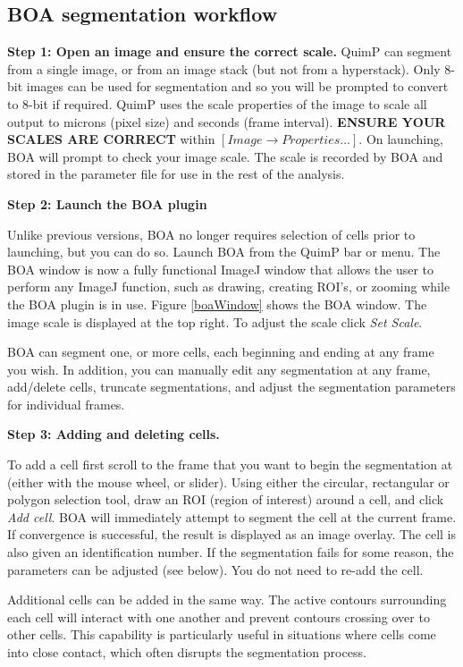 \documentclass[a4paper,12pt]{article}
\begin{document}
\subsection{BOA segmentation workflow}
\textbf{Step 1: Open an image and ensure the correct scale.}  QuimP can segment from a single image, or from an image stack
(but not from a hyperstack).  Only 8-bit images can be used for segmentation and so you will be prompted to convert to 8-bit 
if required.  QuimP uses the scale properties of the image to scale all output to
 microns (pixel size) and seconds (frame interval).  \textbf{ENSURE YOUR SCALES ARE CORRECT} within $[Image\rightarrow Properties...]$.
 On launching, BOA will prompt to check your image scale. The scale is recorded by BOA and stored in the parameter file for
 use in the rest of the analysis. 


\textbf{Step 2: Launch the BOA plugin} 

Unlike previous versions, BOA no longer requires selection of cells prior to launching, but you can do so.  Launch BOA from the QuimP bar or menu.
The BOA window is now a fully functional ImageJ window that allows the user to perform any ImageJ function, such as drawing,
creating ROI's, or zooming while the BOA plugin is in use.  Figure \ref{boaWindow} shows the BOA window.
The image scale is displayed at the top right.  To adjust the scale click \textit{Set Scale}.      

BOA can segment one, or more cells, each beginning and ending at any frame you wish.  In addition, you can manually 
edit any segmentation at any frame, add/delete cells, truncate segmentations, and adjust the segmentation
parameters for individual frames.

\textbf{Step 3: Adding and deleting cells.} 

To add a cell first scroll to the frame that you want to begin the segmentation at (either with the mouse wheel, or slider).  Using either the
circular, rectangular or polygon selection tool, draw an ROI (region of interest) around a cell, and click \textit{Add cell}.
BOA will immediately attempt to segment 
the cell at the current frame.  If convergence is successful, the result is displayed as an image overlay. The cell is also given an
identification number.
If the segmentation fails for some reason, the parameters can be adjusted (see below). You do not need to re-add the cell.

Additional cells can be added in the same way.   The active contours surrounding each cell will interact with one another and prevent
contours crossing over to other cells.  This capability is particularly useful in situations where cells come into close contact, 
which often disrupts the segmentation process.
\end{document}
